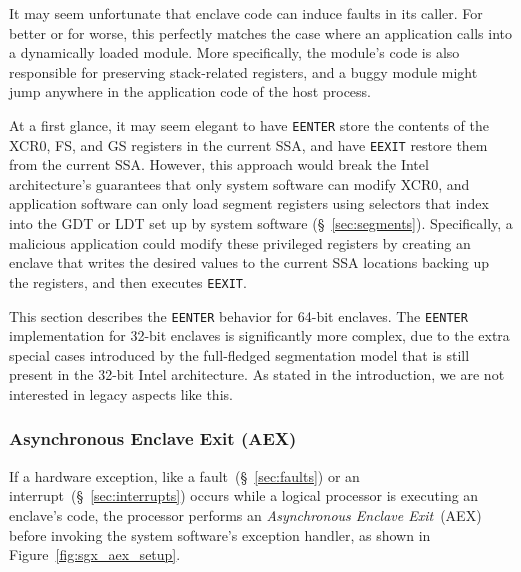 It may seem unfortunate that enclave code can induce faults in its caller.
For better or for worse, this perfectly matches the case where an application
calls into a dynamically loaded module. More specifically, the module's code is
also responsible for preserving stack-related registers, and a buggy module
might jump anywhere in the application code of the host process.

At a first glance, it may seem elegant to have \texttt{EENTER} store the
contents of the XCR0, FS, and GS registers in the current SSA, and have
\texttt{EEXIT} restore them from the current SSA. However, this approach would
break the Intel architecture's guarantees that only system software can modify
XCR0, and application software can only load segment registers using selectors
that index
into the GDT or LDT set up by system software (\S~\ref{sec:segments}).
Specifically, a malicious application could modify these privileged registers
by creating an enclave that writes the desired values to the current SSA
locations backing up the registers, and then executes \texttt{EEXIT}.

This section describes the \texttt{EENTER} behavior for 64-bit enclaves. The
\texttt{EENTER} implementation for 32-bit enclaves is significantly more
complex, due to the extra special cases introduced by the full-fledged
segmentation model that is still present in the 32-bit Intel architecture. As
stated in the introduction, we are not interested in legacy aspects like this.


\subsubsection{Asynchronous Enclave Exit (AEX)}
\label{sec:sgx_aex}

If a hardware exception, like a fault~(\S~\ref{sec:faults}) or an
interrupt~(\S~\ref{sec:interrupts}) occurs while a logical processor is
executing an enclave's code, the processor performs an
\textit{Asynchronous Enclave Exit}~(AEX) before invoking the system software's
exception handler, as shown in Figure~\ref{fig:sgx_aex_setup}.

